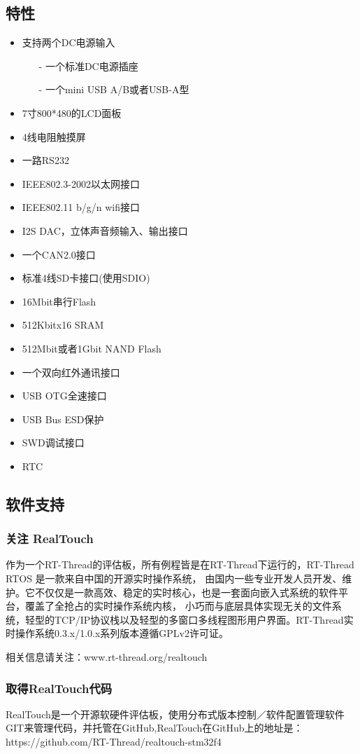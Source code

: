 \documentclass[titlepage]{article}
\begin{document}
\subsection{特性}
 \begin{itemize}
 \item 支持两个DC电源输入
    \begin{itemize}
    \item[-] 一个标准DC电源插座
    \item[-] 一个mini USB A/B或者USB-A型
    \end{itemize}
 \item 7寸800*480的LCD面板
 \item 4线电阻触摸屏
 \item 一路RS232
 \item IEEE802.3-2002以太网接口
 \item IEEE802.11 b/g/n wifi接口
 \item I2S DAC，立体声音频输入、输出接口
 \item 一个CAN2.0接口
 \item 标准4线SD卡接口(使用SDIO)
 \item 16Mbit串行Flash
 \item 512Kbitx16 SRAM
 \item 512Mbit或者1Gbit NAND Flash
 \item 一个双向红外通讯接口
 \item USB OTG全速接口
 \item USB Bus ESD保护
 \item SWD调试接口
 \item RTC
 \end{itemize}

  \subsection{软件支持}
  \subsubsection{关注 RealTouch}
 作为一个RT-Thread的评估板，所有例程皆是在RT-Thread下运行的，RT-Thread RTOS 是一款来自中国的开源实时操作系统，
 由国内一些专业开发人员开发、维护。它不仅仅是一款高效、稳定的实时核心，也是一套面向嵌入式系统的软件平台，覆盖了全抢占的实时操作系统内核，
 小巧而与底层具体实现无关的文件系统，轻型的TCP/IP协议栈以及轻型的多窗口多线程图形用户界面。RT-Thread实时操作系统0.3.x/1.0.x系列版本遵循GPLv2许可证。

 相关信息请关注：www.rt-thread.org/realtouch
 \subsubsection{取得RealTouch代码}
 RealTouch是一个开源软硬件评估板，使用分布式版本控制／软件配置管理软件GIT来管理代码，并托管在GitHub,RealTouch在GitHub上的地址是：https://github.com/RT-Thread/realtouch-stm32f4
\newpage
\end{document}
